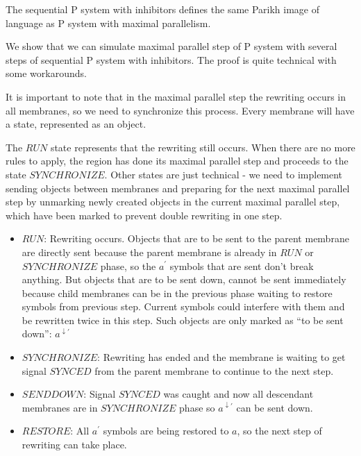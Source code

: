\begin{veta}
  The sequential P system with inhibitors defines the same Parikh image of language as P system with maximal parallelism.
\end{veta}

\begin{dokaz}
  We show that we can simulate maximal parallel step of P system with several steps of sequential P system with inhibitors. The proof is quite technical with some workarounds.


  It is important to note that in the maximal parallel step the rewriting occurs in all membranes, so we need to synchronize this process. Every membrane will have a state, represented as an object.

  The $RUN$ state represents that the rewriting still occurs. When there are no more rules to apply, the region has done its maximal parallel step and proceeds to the state $SYNCHRONIZE$. Other states are just technical - we need to implement sending objects between membranes and preparing for the next maximal parallel step by unmarking newly created objects in the current maximal parallel step, which have been marked to prevent double rewriting in one step.

  \begin{itemize}
    \item $RUN$: Rewriting occurs. Objects that are to be sent to the parent membrane are directly sent because the parent membrane is already in $RUN$ or $SYNCHRONIZE$ phase, so the $a^{\prime}$ symbols that are sent don't break anything. But objects that are to be sent down, cannot be sent immediately because child membranes can be in the previous phase waiting to restore symbols from previous step. Current symbols could interfere with them and be rewritten twice in this step. Such objects are only marked as ``to be sent down'': $a^{\downarrow\prime}$

    \item $SYNCHRONIZE$: Rewriting has ended and the membrane is waiting to get signal $SYNCED$ from the parent membrane to continue to the next step.

    \item $SENDDOWN$: Signal $SYNCED$ was caught and now all descendant membranes are in $SYNCHRONIZE$ phase so $a^{\downarrow\prime}$ can be sent down.

    \item $RESTORE$: All $a^{\prime}$ symbols are being restored to $a$, so the next step of rewriting can take place.
  \end{itemize}


\end{dokaz}
